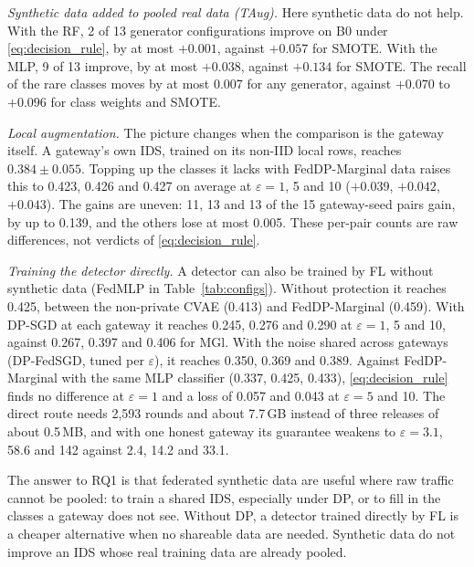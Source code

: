 \documentclass[conference]{IEEEtran}
\begin{document}
\textit{Synthetic data added to pooled real data (TAug).} Here synthetic data do not help. With the RF, 2 of 13 generator configurations improve on B0 under \eqref{eq:decision_rule}, by at most $+0.001$, against $+0.057$ for SMOTE. With the MLP, 9 of 13 improve, by at most $+0.038$, against $+0.134$ for SMOTE. The recall of the rare classes moves by at most 0.007 for any generator, against $+0.070$ to $+0.096$ for class weights and SMOTE.

\textit{Local augmentation.} The picture changes when the comparison is the gateway itself. A gateway's own IDS, trained on its non-IID local rows, reaches $0.384 \pm 0.055$. Topping up the classes it lacks with FedDP-Marginal data raises this to 0.423, 0.426 and 0.427 on average at $\varepsilon = 1$, 5 and 10 ($+0.039$, $+0.042$, $+0.043$). The gains are uneven: 11, 13 and 13 of the 15 gateway-seed pairs gain, by up to 0.139, and the others lose at most 0.005. These per-pair counts are raw differences, not verdicts of \eqref{eq:decision_rule}.

\textit{Training the detector directly.} A detector can also be trained by FL without synthetic data (FedMLP in Table~\ref{tab:configs}). Without protection it reaches 0.425, between the non-private CVAE (0.413) and FedDP-Marginal (0.459). With DP-SGD at each gateway it reaches 0.245, 0.276 and 0.290 at $\varepsilon = 1$, 5 and 10, against 0.267, 0.397 and 0.406 for MGl. With the noise shared across gateways (DP-FedSGD, tuned per $\varepsilon$), it reaches 0.350, 0.369 and 0.389. Against FedDP-Marginal with the same MLP classifier (0.337, 0.425, 0.433), \eqref{eq:decision_rule} finds no difference at $\varepsilon = 1$ and a loss of 0.057 and 0.043 at $\varepsilon = 5$ and 10. The direct route needs 2,593 rounds and about 7.7\,GB instead of three releases of about 0.5\,MB, and with one honest gateway its guarantee weakens to $\varepsilon = 3.1$, 58.6 and 142 against 2.4, 14.2 and 33.1.

The answer to RQ1 is that federated synthetic data are useful where raw traffic cannot be pooled: to train a shared IDS, especially under DP, or to fill in the classes a gateway does not see. Without DP, a detector trained directly by FL is a cheaper alternative when no shareable data are needed. Synthetic data do not improve an IDS whose real training data are already pooled.
\end{document}
